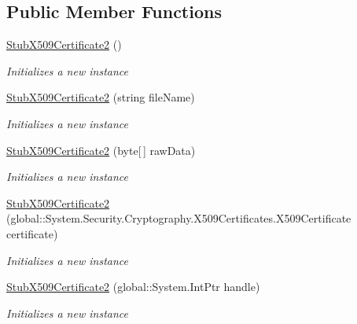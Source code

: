 \subsection*{Public Member Functions}
\begin{DoxyCompactItemize}
\item 
\hyperlink{class_system_1_1_security_1_1_cryptography_1_1_x509_certificates_1_1_fakes_1_1_stub_x509_certificate2_aafdd7b3c770051788a7a8aff270dfd8b}{Stub\-X509\-Certificate2} ()
\begin{DoxyCompactList}\small\item\em Initializes a new instance\end{DoxyCompactList}\item 
\hyperlink{class_system_1_1_security_1_1_cryptography_1_1_x509_certificates_1_1_fakes_1_1_stub_x509_certificate2_a083f250ff9f0190e138f31fa5e34951a}{Stub\-X509\-Certificate2} (string file\-Name)
\begin{DoxyCompactList}\small\item\em Initializes a new instance\end{DoxyCompactList}\item 
\hyperlink{class_system_1_1_security_1_1_cryptography_1_1_x509_certificates_1_1_fakes_1_1_stub_x509_certificate2_adade3d6c1512e46ab2056fd6a8ef6984}{Stub\-X509\-Certificate2} (byte\mbox{[}$\,$\mbox{]} raw\-Data)
\begin{DoxyCompactList}\small\item\em Initializes a new instance\end{DoxyCompactList}\item 
\hyperlink{class_system_1_1_security_1_1_cryptography_1_1_x509_certificates_1_1_fakes_1_1_stub_x509_certificate2_a7954d6accdea74d7e6fac19a157dd7f1}{Stub\-X509\-Certificate2} (global\-::\-System.\-Security.\-Cryptography.\-X509\-Certificates.\-X509\-Certificate certificate)
\begin{DoxyCompactList}\small\item\em Initializes a new instance\end{DoxyCompactList}\item 
\hyperlink{class_system_1_1_security_1_1_cryptography_1_1_x509_certificates_1_1_fakes_1_1_stub_x509_certificate2_a47d99ad440bcc38e9dafaef370b51c66}{Stub\-X509\-Certificate2} (global\-::\-System.\-Int\-Ptr handle)
\begin{DoxyCompactList}\small\item\em Initializes a new instance\end{DoxyCompactList}\item 

\end{DoxyCompactItemize}
